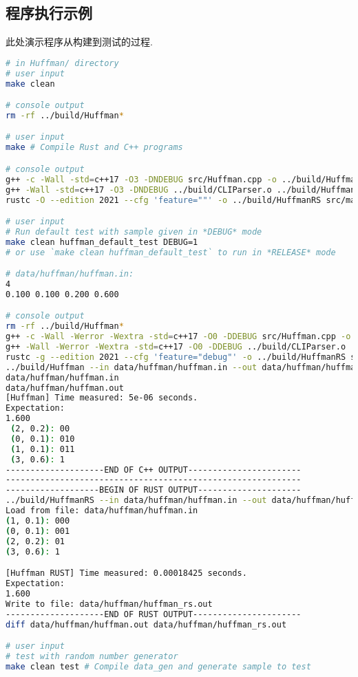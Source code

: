 \subsection{程序执行示例}
此处演示程序从构建到测试的过程.
\begin{lstlisting}[language=bash]
# in Huffman/ directory
# user input
make clean

# console output
rm -rf ../build/Huffman*

# user input
make # Compile Rust and C++ programs

# console output
g++ -c -Wall -std=c++17 -O3 -DNDEBUG src/Huffman.cpp -o ../build/Huffman.o
g++ -Wall -std=c++17 -O3 -DNDEBUG ../build/CLIParser.o ../build/Huffman.o -o ../build/Huffman
rustc -O --edition 2021 --cfg 'feature=""' -o ../build/HuffmanRS src/main.rs

# user input
# Run default test with sample given in *DEBUG* mode
make clean huffman_default_test DEBUG=1
# or use `make clean huffman_default_test` to run in *RELEASE* mode

# data/huffman/huffman.in:
4
0.100 0.100 0.200 0.600

# console output
rm -rf ../build/Huffman*
g++ -c -Wall -Werror -Wextra -std=c++17 -O0 -DDEBUG src/Huffman.cpp -o ../build/Huffman.o
g++ -Wall -Werror -Wextra -std=c++17 -O0 -DDEBUG ../build/CLIParser.o ../build/Huffman.o -o ../build/Huffman
rustc -g --edition 2021 --cfg 'feature="debug"' -o ../build/HuffmanRS src/main.rs
../build/Huffman --in data/huffman/huffman.in --out data/huffman/huffman.out
data/huffman/huffman.in
data/huffman/huffman.out
[Huffman] Time measured: 5e-06 seconds.
Expectation:
1.600
 (2, 0.2): 00
 (0, 0.1): 010
 (1, 0.1): 011
 (3, 0.6): 1
--------------------END OF C++ OUTPUT-----------------------
------------------------------------------------------------
-------------------BEGIN OF RUST OUTPUT---------------------
../build/HuffmanRS --in data/huffman/huffman.in --out data/huffman/huffman_rs.out
Load from file: data/huffman/huffman.in
(1, 0.1): 000
(0, 0.1): 001
(2, 0.2): 01
(3, 0.6): 1

[Huffman RUST] Time measured: 0.00018425 seconds.
Expectation:
1.600
Write to file: data/huffman/huffman_rs.out
--------------------END OF RUST OUTPUT----------------------
diff data/huffman/huffman.out data/huffman/huffman_rs.out

# user input
# test with random number generator
make clean test # Compile data_gen and generate sample to test


\end{lstlisting}
